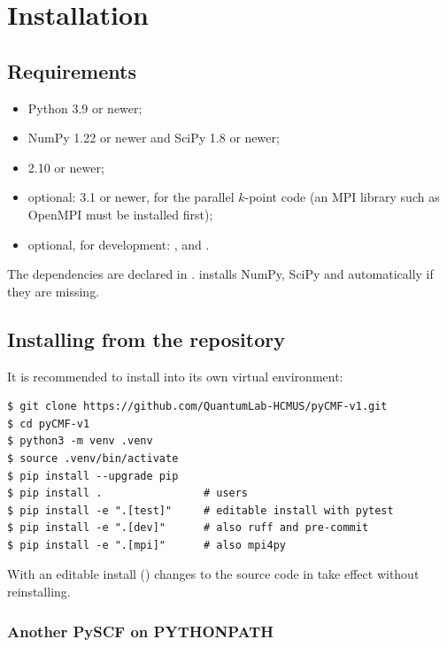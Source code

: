 \chapter{Installation}
\label{ch:install}

\section{Requirements}

\begin{itemize}
  \item Python 3.9 or newer;
  \item NumPy 1.22 or newer and SciPy 1.8 or newer;
  \item \pyscf{} 2.10 or newer;
  \item optional:  3.1 or newer, for the parallel $k$-point code
        (an MPI library such as OpenMPI must be installed first);
  \item optional, for development: ,  and
        .
\end{itemize}

The dependencies are declared in .  installs
NumPy, SciPy and \pyscf{} automatically if they are missing.

\section{Installing from the repository}

It is recommended to install \pycmf{} into its own virtual environment:

\begin{lstlisting}[style=shell]
$ git clone https://github.com/QuantumLab-HCMUS/pyCMF-v1.git
$ cd pyCMF-v1
$ python3 -m venv .venv
$ source .venv/bin/activate
$ pip install --upgrade pip
$ pip install .                # users
$ pip install -e ".[test]"     # editable install with pytest
$ pip install -e ".[dev]"      # also ruff and pre-commit
$ pip install -e ".[mpi]"      # also mpi4py
\end{lstlisting}

With an editable install () changes to the source code in
 take effect without reinstalling.

\subsection*{Another PySCF on PYTHONPATH}


